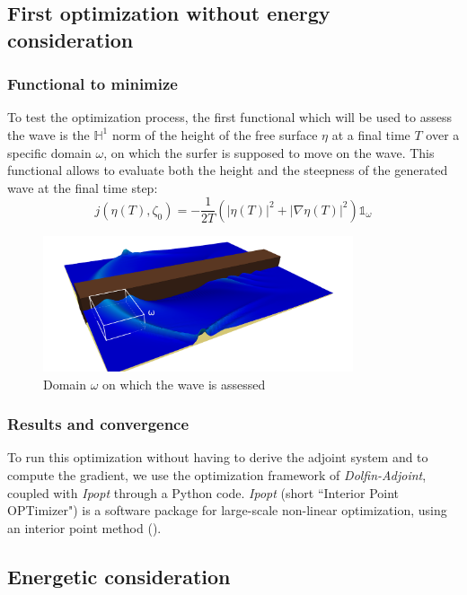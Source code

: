 \documentclass[11pt,a4paper]{article}
\begin{document}
\subsection{First optimization without energy consideration}
\subsubsection{Functional to minimize}
	To test the optimization process, the first functional which will be used to assess the wave is the $\mathbb{H}^1$ norm of the height of the free surface  $\eta$ at a final time $T$ over a specific domain $\omega$, on which the surfer is supposed to move on the wave. This functional allows to evaluate both the height and the steepness of the generated wave at the final time step:
	\begin{equation}
		j(\eta(T),\zeta_0) = - \frac{1}{2T}(|\eta(T)|^2 + |\nabla \eta(T)|^2) \mathds{1}_{\omega}
	\end{equation}
	\begin{figure}[!h]
		\centering
		\includegraphics[height=4cm]{OptimizationDomain}
		\caption{Domain $\omega$ on which the wave is assessed}
	\end{figure}

\subsubsection{Results and convergence}		
	To run this optimization without having to derive the adjoint system and to compute the gradient, we use the optimization framework of \textit{Dolfin-Adjoint}, coupled with \textit{Ipopt} through a Python code.	\textit{Ipopt} (short ``Interior Point OPTimizer") is a software package for large-scale non-linear optimization, using an interior point method (\cite{IPOPT}).
	
\pagebreak

\subsection{Energetic consideration}
\end{document}
